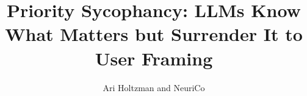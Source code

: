 \documentclass{article}
\title{Priority Sycophancy: LLMs Know What Matters but Surrender It to User Framing}
\author{Ari Holtzman and NeuriCo}
\begin{document}
\maketitle

\begin{abstract}

\end{abstract}









\end{document}
